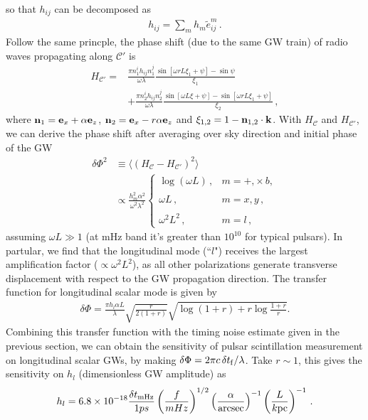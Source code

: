 \documentclass[prl,aps,floatfix,superscriptaddress,twocolumn]{revtex4}
\begin{document}
so that $h_{ij}$ can be decomposed as 
\begin{align}
h_{ij} = \sum_{m} h_m \tilde{e}^m_{ij}\,.
\end{align}  
Follow the same princple, the phase shift (due to the same GW train) of radio waves propagating along $\mathcal{C}'$ is
\begin{align}\label{eqcp}
H_{\mathcal{C}'}= &\frac{\pi n_1^i h_{ij} n_1^j}{\omega \lambda} \frac{\sin [\omega r L \xi_1+\psi]-\sin \psi}{\xi_1}\nonumber\\
&+\frac{\pi n_2^i h_{ij} n_2^j}{\omega \lambda} \frac{\sin [\omega L \xi+\psi]-\sin [\omega r L \xi_1+\psi]}{\xi_2}\,,
\end{align}
where ${\bf n}_1={\bf e}_x+\alpha {\bf e}_z$, ${\bf n}_2 ={\bf e}_x-r \alpha  {\bf e}_z$ and $\xi_{1,2}=1-{\bf n}_{1,2} \cdot {\bf k}$. With $H_{\mathcal{C}}$ and $H_{\mathcal{C}'}$, we can derive the phase shift after averaging over sky direction and initial phase of the GW  
\begin{align}
\delta \Phi^2 &\equiv \langle (H_{\mathcal{C}}-H_{\mathcal{C}'})^2\rangle \nonumber \\
&\propto  \frac{h^2_m \alpha^2}{\omega^2 \lambda^2} \left\{
\begin{array}{cl}
 \log(\omega L)\,, & m=+, \times\, b, \\
\\
 \omega L\,, & m =x, y\,, \\
\\
\omega^2L^2\,, & m=l\,,
\end{array}\right.
\label{bx}
\end{align}
assuming $\omega L \gg 1$ (at mHz band it's greater than $10^{10}$ for typical pulsars). In partular, we find that the longitudinal mode (``$l$") receives the largest amplification factor ($\propto \omega^2 L^2$), as all other polarizations generate transverse displacement with respect to the GW propagation direction. The transfer function for longitudinal scalar mode is given by
\begin{align}
\delta \Phi =\frac{ \pi h_l \alpha L}{\lambda}\sqrt{\frac{r}{2(1+r)}} \sqrt{ \log (1+r)+r\log \frac{1+r}{r}}.
\end{align}
Combining this transfer function  with the timing noise estimate given in the previous section, we can obtain the sensitivity of pulsar scintillation measurement on longitudinal scalar GWs, by making $\delta \Phi =2 \pi c\, \delta t_{\rm f}/\lambda$. Take $r \sim 1$, this gives the sensitivity on $h_l$ (dimensionless GW amplitude) as
\begin{align}
h_l = 6.8\times 10^{-18}  \frac{\delta t_{\rm mHz}}{1 ps}   \left (\frac{f}{ m Hz} \right )^{1/2} \left (\frac{\alpha}{{\rm arcsec}} \right )^{-1} \left ( \frac{L}{k {\rm pc}}\right)^{-1}\,.
\end{align}
\end{document}

